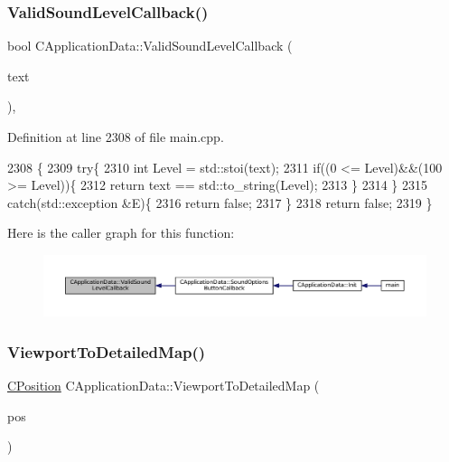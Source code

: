 \subsubsection{\texorpdfstring{Valid\+Sound\+Level\+Callback()}{ValidSoundLevelCallback()}}
{\footnotesize\ttfamily bool C\+Application\+Data\+::\+Valid\+Sound\+Level\+Callback (\begin{DoxyParamCaption}\item[{const std\+::string \&}]{text }\end{DoxyParamCaption})\hspace{0.3cm}{\ttfamily [static]}, {\ttfamily [protected]}}



Definition at line 2308 of file main.\+cpp.


\begin{DoxyCode}
2308                                                                    \{
2309     \textcolor{keywordflow}{try}\{
2310         \textcolor{keywordtype}{int} Level = std::stoi(text);
2311         \textcolor{keywordflow}{if}((0 <= Level)&&(100 >= Level))\{
2312             \textcolor{keywordflow}{return} text == std::to\_string(Level);
2313         \}
2314     \}
2315     \textcolor{keywordflow}{catch}(std::exception &E)\{
2316         \textcolor{keywordflow}{return} \textcolor{keyword}{false};
2317     \}
2318     \textcolor{keywordflow}{return} \textcolor{keyword}{false};
2319 \}
\end{DoxyCode}
Here is the caller graph for this function\+:\nopagebreak
\begin{figure}[H]
\begin{center}
\leavevmode
\includegraphics[width=350pt]{classCApplicationData_ae3216a4fccd68c9657d7e936b1a6df67_icgraph}
\end{center}
\end{figure}
\hypertarget{classCApplicationData_a2871f1b0855d14ed77db1abd83585d64}{}\label{classCApplicationData_a2871f1b0855d14ed77db1abd83585d64} 
\subsubsection{\texorpdfstring{Viewport\+To\+Detailed\+Map()}{ViewportToDetailedMap()}}
{\footnotesize\ttfamily \hyperlink{classCPosition}{C\+Position} C\+Application\+Data\+::\+Viewport\+To\+Detailed\+Map (\begin{DoxyParamCaption}\item[{const \hyperlink{classCPosition}{C\+Position} \&}]{pos }\end{DoxyParamCaption})\hspace{0.3cm}{\ttfamily [protected]}}



